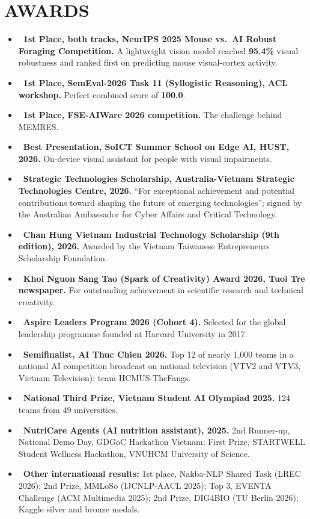 \documentclass[10pt,a4paper]{article}
\begin{document}
\section*{AWARDS}
{\small
\begin{itemize}[label={},labelwidth=0pt,labelsep=0pt, itemsep=3pt]
    \item \textbf{\faTrophy\ 1st Place, both tracks, NeurIPS 2025 Mouse vs.\ AI Robust Foraging Competition.} A lightweight vision model reached \textbf{95.4\%} visual robustness and ranked first on predicting mouse visual-cortex activity.
    \item \textbf{\faTrophy\ 1st Place, SemEval-2026 Task 11 (Syllogistic Reasoning), ACL workshop.} Perfect combined score of \textbf{100.0}.
    \item \textbf{\faTrophy\ 1st Place, FSE-AIWare 2026 competition.} The challenge behind MEMRES.
    \item \textbf{\faTrophy\ Best Presentation, SoICT Summer School on Edge AI, HUST, 2026.} On-device visual assistant for people with visual impairments.
    \item \textbf{\faAward\ Strategic Technologies Scholarship, Australia-Vietnam Strategic Technologies Centre, 2026.} ``For exceptional achievement and potential contributions toward shaping the future of emerging technologies''; signed by the Australian Ambassador for Cyber Affairs and Critical Technology.
    \item \textbf{\faAward\ Chan Hung Vietnam Industrial Technology Scholarship (9th edition), 2026.} Awarded by the Vietnam Taiwanese Entrepreneurs Scholarship Foundation.
    \item \textbf{\faAward\ Khoi Nguon Sang Tao (Spark of Creativity) Award 2026, Tuoi Tre newspaper.} For outstanding achievement in scientific research and technical creativity.
    \item \textbf{\faAward\ Aspire Leaders Program 2026 (Cohort 4).} Selected for the global leadership programme founded at Harvard University in 2017.
    \item \textbf{\faMedal\ Semifinalist, AI Thuc Chien 2026.} Top 12 of nearly 1,000 teams in a national AI competition broadcast on national television (VTV2 and VTV3, Vietnam Television); team HCMUS-TheFangs.
    \item \textbf{\faMedal\ National Third Prize, Vietnam Student AI Olympiad 2025.} 124 teams from 49 universities.
    \item \textbf{\faMedal\ NutriCare Agents (AI nutrition assistant), 2025.} 2nd Runner-up, National Demo Day, GDGoC Hackathon Vietnam; First Prize, STARTWELL Student Wellness Hackathon, VNUHCM University of Science.
    \item \textbf{\faMedal\ Other international results:} 1st place, Nakba-NLP Shared Task (LREC 2026); 2nd Prize, MMLoSo (IJCNLP-AACL 2025); Top 3, EVENTA Challenge (ACM Multimedia 2025); 2nd Prize, DIG4BIO (TU Berlin 2026); Kaggle silver and bronze medals.
\end{itemize}
}
\end{document}
